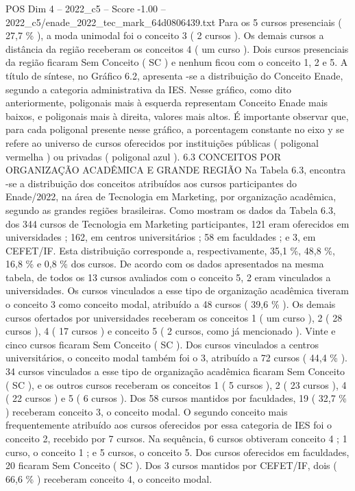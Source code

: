 \begin{textsample}{POS Dim 4 – 2022\_c5 – Score -1.00 – 2022\_c5/enade\_2022\_tec\_mark\_64d0806439.txt}
Para os 5 cursos presenciais ( 27,7 \% ), a moda unimodal foi o conceito 3 ( 2 cursos ).
Os demais cursos a distância da região receberam os conceitos 4 ( um curso ).
Dois cursos presenciais da região ficaram Sem Conceito ( SC ) e nenhum ficou com o conceito 1, 2 e 5.
A título de síntese, no Gráfico 6.2, apresenta -se a distribuição do Conceito Enade, segundo a categoria administrativa da IES.
Nesse gráfico, como dito anteriormente, poligonais mais à esquerda representam Conceito Enade mais baixos, e poligonais mais à direita, valores mais altos.
É importante observar que, para cada poligonal presente nesse gráfico, a porcentagem constante no eixo y se refere ao universo de cursos oferecidos por instituições públicas ( poligonal vermelha ) ou privadas ( poligonal azul ). 6.3 CONCEITOS POR ORGANIZAÇÃO ACADÊMICA E GRANDE REGIÃO Na Tabela 6.3, encontra -se a distribuição dos conceitos atribuídos aos cursos participantes do Enade/2022, na área de Tecnologia em Marketing, por organização acadêmica, segundo as grandes regiões brasileiras.
Como mostram os dados da Tabela 6.3, dos 344 cursos de Tecnologia em Marketing participantes, 121 eram oferecidos em universidades ; 162, em centros universitários ; 58 em faculdades ; e 3, em CEFET/IF.
Esta distribuição corresponde a, respectivamente, 35,1 \%, 48,8 \%, 16,8 \% e 0,8 \% dos cursos.
De acordo com os dados apresentados na mesma tabela, de todos os 13 cursos avaliados com o conceito 5, 2 eram vinculados a universidades.
Os cursos vinculados a esse tipo de organização acadêmica tiveram o conceito 3 como conceito modal, atribuído a 48 cursos ( 39,6 \% ).
Os demais cursos ofertados por universidades receberam os conceitos 1 ( um curso ), 2 ( 28 cursos ), 4 ( 17 cursos ) e conceito 5 ( 2 cursos, como já mencionado ).
Vinte e cinco cursos ficaram Sem Conceito ( SC ).
Dos cursos vinculados a centros universitários, o conceito modal também foi o 3, atribuído a 72 cursos ( 44,4 \% ). 34 cursos vinculados a esse tipo de organização acadêmica ficaram Sem Conceito ( SC ), e os outros cursos receberam os conceitos 1 ( 5 cursos ), 2 ( 23 cursos ), 4 ( 22 cursos ) e 5 ( 6 cursos ).
Dos 58 cursos mantidos por faculdades, 19 ( 32,7 \% ) receberam conceito 3, o conceito modal.
O segundo conceito mais frequentemente atribuído aos cursos oferecidos por essa categoria de IES foi o conceito 2, recebido por 7 cursos.
Na sequência, 6 cursos obtiveram conceito 4 ; 1 curso, o conceito 1 ; e 5 cursos, o conceito 5.
Dos cursos oferecidos em faculdades, 20 ficaram Sem Conceito ( SC ).
Dos 3 cursos mantidos por CEFET/IF, dois ( 66,6 \% ) receberam conceito 4, o conceito modal.

\end{textsample}
